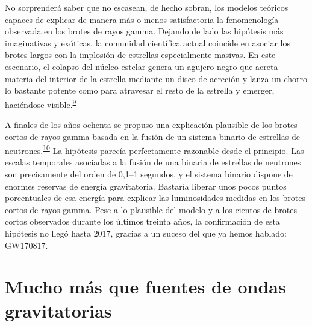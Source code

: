 No sorprenderá saber que no escasean, de hecho sobran, los modelos teóricos capaces de explicar de manera más o menos satisfactoria la fenomenología observada en los brotes de rayos gamma. Dejando de lado las hipótesis más imaginativas y exóticas, la comunidad científica actual coincide en asociar los brotes largos con la implosión de estrellas especialmente masivas. En este escenario, el colapso del núcleo estelar genera un agujero negro que acreta materia del interior de la estrella mediante un disco de acreción y lanza un chorro lo bastante potente como para atravesar el resto de la estrella y emerger, haciéndose visible.\textsuperscript{\hyperlink{note:08-09}{9}}

A finales de los años ochenta se propuso una explicación plausible de los brotes cortos de rayos gamma basada en la fusión de un sistema binario de estrellas de neutrones.\textsuperscript{\hyperlink{note:08-10}{10}} La hipótesis parecía perfectamente razonable desde el principio. Las escalas temporales asociadas a la fusión de una binaria de estrellas de neutrones son precisamente del orden de 0,1--1 segundos, y el sistema binario dispone de enormes reservas de energía gravitatoria. Bastaría liberar unos pocos puntos porcentuales de esa energía para explicar las luminosidades medidas en los brotes cortos de rayos gamma. Pese a lo plausible del modelo y a los cientos de brotes cortos observados durante los últimos treinta años, la confirmación de esta hipótesis no llegó hasta 2017, gracias a un suceso del que ya hemos hablado: GW170817.

\section{Mucho más que fuentes de ondas gravitatorias}\label{sec:08-multimessenger}

